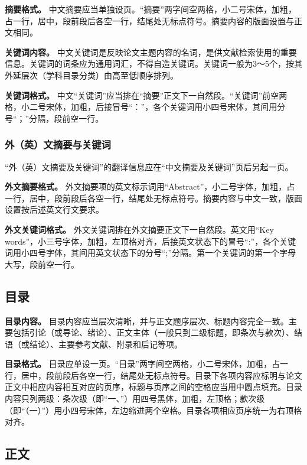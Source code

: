 \documentclass[singlesided]{Style/ucasthesis}%
\begin{document}
\textbf{摘要格式。} 中文摘要应当单独设页。``摘要''两字间空两格，小二号宋体，加粗，占一行，居中，段前段后各空一行，结尾处无标点符号。摘要内容的版面设置与正文相同。

\textbf{关键词内容。} 中文关键词是反映论文主题内容的名词，是供文献检索使用的重要信息。关键词的词条应为通用词汇，不得自造关键词。关键词一般为3～5个，按其外延层次（学科目录分类）由高至低顺序排列。

\textbf{关键词格式。} 中文``关键词''应当排在``摘要''正文下一自然段。``关键词''前空两格，小二号宋体，加粗，后接冒号``：''，各个关键词用小四号宋体，其间用分号``；''分隔，段前空一行。

\hypertarget{section-16}{%
\subsubsection{外（英）文摘要与关键词}\label{section-16}}

``外（英）文摘要及关键词''的翻译信息应在``中文摘要及关键词''页后另起一页。

\textbf{外文摘要格式。} 外文摘要项的英文标示词用``Abstract''，小二号字体，加粗，占一行，居中，段前段后各空一行，结尾处无标点符号。摘要内容与中文一致，版面设置按后述英文行文要求。

\textbf{外文关键词格式。} 外文关键词排在外文摘要正文下一自然段。英文用``Key words''，小三号字体，加粗，左顶格对齐，后接英文状态下的冒号``:''，各个关键词用小四号字体，其间用英文状态下的分号``;''分隔。第一个关键词的第一个字母大写，段前空一行。

\hypertarget{section-17}{%
\subsection{目录}\label{section-17}}

\textbf{目录内容。} 目录内容应当层次清晰，并与正文题序层次、标题内容完全一致。主要包括引论（或导论、绪论）、正文主体（一般只到二级标题，即条次与款次）、结语（或结论）、主要参考文献、附录和后记等项。

\textbf{目录格式。} 目录应单设一页。``目录''两字间空两格，小二号宋体，加粗，占一行，居中，段前段后各空一行，结尾处无标点符号。目录下各项内容应标明与论文正文中相应内容相互对应的页序，标题与页序之间的空格应当用中圆点填充。目录内容只列两级：条次级（即``一、''）用四号黑体，加粗，左顶格；款次级（即``（一）''）用小四号宋体，左边缩进两个空格。目录各项相应页序统一为右顶格对齐。

\hypertarget{section-18}{%
\subsection{正文}\label{section-18}}
\end{document}
